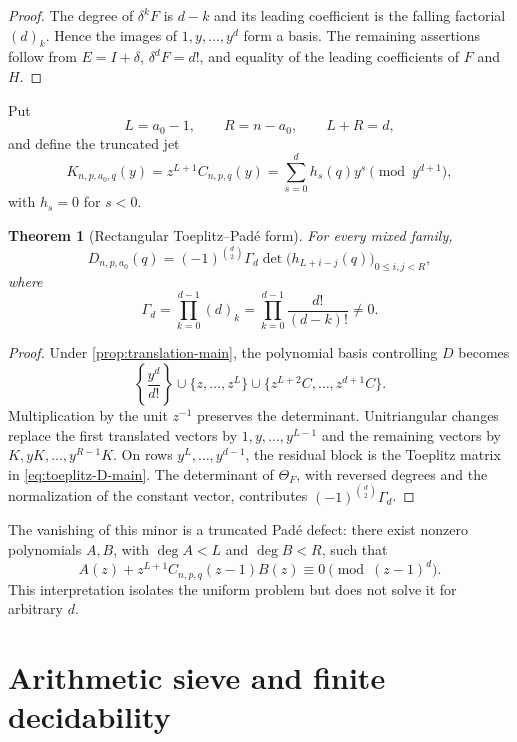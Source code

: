 \documentclass[11pt]{amsart}
\newcommand{\1}{\mathbf 1}
\newtheorem{theorem}{Theorem}[section]
\theoremstyle{remark}
\begin{document}
\begin{proof}
The degree of $\delta^kF$ is $d-k$ and its leading coefficient is the falling factorial $(d)_k$. Hence the images of $1,y,\ldots,y^d$ form a basis. The remaining assertions follow from $E=I+\delta$, $\delta^dF=d!$, and equality of the leading coefficients of $F$ and $H$.
\end{proof}

Put
\[
 L=a_0-1,\qquad R=n-a_0,\qquad L+R=d,
\]
and define the truncated jet
\begin{equation}\label{eq:Kjet-main}
 K_{n,p,a_0,q}(y)=z^{L+1}C_{n,p,q}(y)
 =\sum_{s=0}^dh_s(q)y^s\pmod{y^{d+1}},
\end{equation}
with $h_s=0$ for $s<0$.

\begin{theorem}[Rectangular Toeplitz--Pad\'e form]\label{thm:toeplitz-main}
For every mixed family,
\begin{equation}\label{eq:toeplitz-D-main}
 D_{n,p,a_0}(q)=(-1)^{\binom d2}\Gamma_d
 \det\bigl(h_{L+i-j}(q)\bigr)_{0\le i,j<R},
\end{equation}
where
\[
 \Gamma_d=\prod_{k=0}^{d-1}(d)_k
 =\prod_{k=0}^{d-1}\frac{d!}{(d-k)!}\ne0.
\]
\end{theorem}

\begin{proof}
Under \cref{prop:translation-main}, the polynomial basis controlling $D$ becomes
\[
 \left\{\frac{y^d}{d!}\right\}\cup\{z,\ldots,z^L\}
 \cup\{z^{L+2}C,\ldots,z^{d+1}C\}.
\]
Multiplication by the unit $z^{-1}$ preserves the determinant. Unitriangular changes replace the first translated vectors by $1,y,\ldots,y^{L-1}$ and the remaining vectors by $K,yK,\ldots,y^{R-1}K$. On rows $y^L,\ldots,y^{d-1}$, the residual block is the Toeplitz matrix in \eqref{eq:toeplitz-D-main}. The determinant of $\Theta_F$, with reversed degrees and the normalization of the constant vector, contributes $(-1)^{\binom d2}\Gamma_d$.
\end{proof}

The vanishing of this minor is a truncated Pad\'e defect: there exist nonzero polynomials $A,B$, with $\deg A<L$ and $\deg B<R$, such that
\[
 A(z)+z^{L+1}C_{n,p,q}(z-1)B(z)\equiv0\pmod{(z-1)^d}.
\]
This interpretation isolates the uniform problem but does not solve it for arbitrary $d$.

\section{Arithmetic sieve and finite decidability}
\label{sec:decidability}
\end{document}
